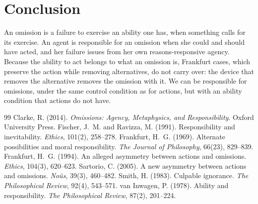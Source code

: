 \documentclass{situationist-preprint}
\begin{document}
\section{Conclusion}

An omission is a failure to exercise an ability one has, when something calls for its exercise. An agent is responsible for an omission when she could and should have acted, and her failure issues from her own reasons-responsive agency. Because the ability to act belongs to what an omission is, Frankfurt cases, which preserve the action while removing alternatives, do not carry over: the device that removes the alternative removes the omission with it. We can be responsible for omissions, under the same control condition as for actions, but with an ability condition that actions do not have.

\begin{thebibliography}{99}\small
{} Clarke, R. (2014). \emph{Omissions: Agency, Metaphysics, and Responsibility}. Oxford University Press.
 Fischer, J.~M. and Ravizza, M. (1991). Responsibility and inevitability. \emph{Ethics}, 101(2), 258--278.
 Frankfurt, H.~G. (1969). Alternate possibilities and moral responsibility. \emph{The Journal of Philosophy}, 66(23), 829--839.
 Frankfurt, H.~G. (1994). An alleged asymmetry between actions and omissions. \emph{Ethics}, 104(3), 620--623.
 Sartorio, C. (2005). A new asymmetry between actions and omissions. \emph{No\^us}, 39(3), 460--482.
 Smith, H. (1983). Culpable ignorance. \emph{The Philosophical Review}, 92(4), 543--571.
 van Inwagen, P. (1978). Ability and responsibility. \emph{The Philosophical Review}, 87(2), 201--224.
\end{thebibliography}
\end{document}
